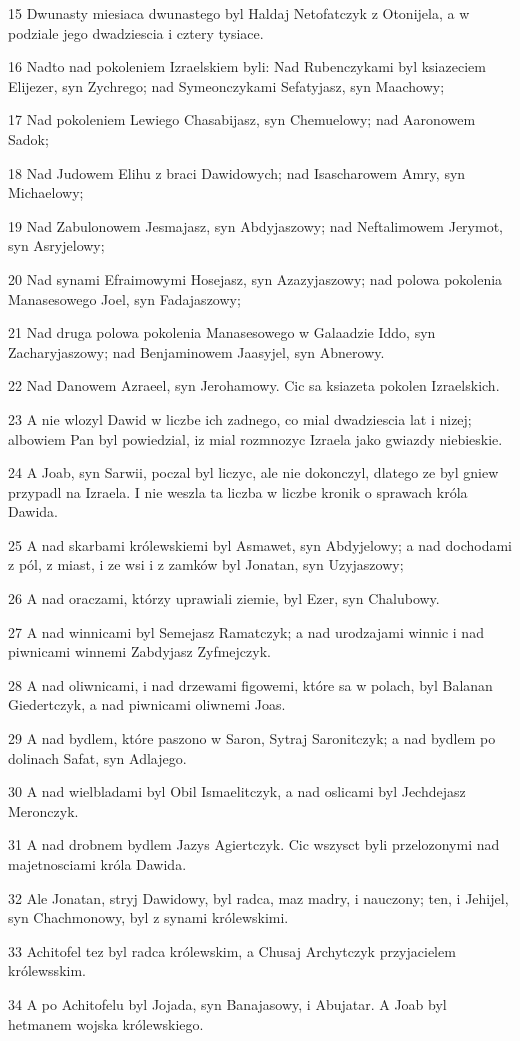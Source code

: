 \par 15 Dwunasty miesiaca dwunastego byl Haldaj Netofatczyk z Otonijela, a w podziale jego dwadziescia i cztery tysiace.
\par 16 Nadto nad pokoleniem Izraelskiem byli: Nad Rubenczykami byl ksiazeciem Elijezer, syn Zychrego; nad Symeonczykami Sefatyjasz, syn Maachowy;
\par 17 Nad pokoleniem Lewiego Chasabijasz, syn Chemuelowy; nad Aaronowem Sadok;
\par 18 Nad Judowem Elihu z braci Dawidowych; nad Isascharowem Amry, syn Michaelowy;
\par 19 Nad Zabulonowem Jesmajasz, syn Abdyjaszowy; nad Neftalimowem Jerymot, syn Asryjelowy;
\par 20 Nad synami Efraimowymi Hosejasz, syn Azazyjaszowy; nad polowa pokolenia Manasesowego Joel, syn Fadajaszowy;
\par 21 Nad druga polowa pokolenia Manasesowego w Galaadzie Iddo, syn Zacharyjaszowy; nad Benjaminowem Jaasyjel, syn Abnerowy.
\par 22 Nad Danowem Azraeel, syn Jerohamowy. Cic sa ksiazeta pokolen Izraelskich.
\par 23 A nie wlozyl Dawid w liczbe ich zadnego, co mial dwadziescia lat i nizej; albowiem Pan byl powiedzial, iz mial rozmnozyc Izraela jako gwiazdy niebieskie.
\par 24 A Joab, syn Sarwii, poczal byl liczyc, ale nie dokonczyl, dlatego ze byl gniew przypadl na Izraela. I nie weszla ta liczba w liczbe kronik o sprawach króla Dawida.
\par 25 A nad skarbami królewskiemi byl Asmawet, syn Abdyjelowy; a nad dochodami z pól, z miast, i ze wsi i z zamków byl Jonatan, syn Uzyjaszowy;
\par 26 A nad oraczami, którzy uprawiali ziemie, byl Ezer, syn Chalubowy.
\par 27 A nad winnicami byl Semejasz Ramatczyk; a nad urodzajami winnic i nad piwnicami winnemi Zabdyjasz Zyfmejczyk.
\par 28 A nad oliwnicami, i nad drzewami figowemi, które sa w polach, byl Balanan Giedertczyk, a nad piwnicami oliwnemi Joas.
\par 29 A nad bydlem, które paszono w Saron, Sytraj Saronitczyk; a nad bydlem po dolinach Safat, syn Adlajego.
\par 30 A nad wielbladami byl Obil Ismaelitczyk, a nad oslicami byl Jechdejasz Meronczyk.
\par 31 A nad drobnem bydlem Jazys Agiertczyk. Cic wszysct byli przelozonymi nad majetnosciami króla Dawida.
\par 32 Ale Jonatan, stryj Dawidowy, byl radca, maz madry, i nauczony; ten, i Jehijel, syn Chachmonowy, byl z synami królewskimi.
\par 33 Achitofel tez byl radca królewskim, a Chusaj Archytczyk przyjacielem królewsskim.
\par 34 A po Achitofelu byl Jojada, syn Banajasowy, i Abujatar. A Joab byl hetmanem wojska królewskiego.

